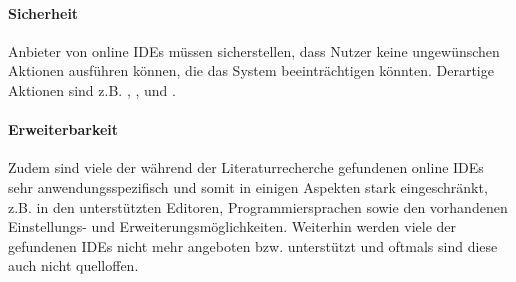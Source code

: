 \paragraph{Sicherheit}
Anbieter von online IDEs müssen sicherstellen, dass Nutzer keine ungewünschen Aktionen ausführen können, die das System beeinträchtigen könnten. Derartige Aktionen sind z.B. , ,  \cite{wu_ceclipse_2011} und  \cite{srinivasa_bad_2022}.

\paragraph{Erweiterbarkeit}
Zudem sind viele der während der Literaturrecherche gefundenen online IDEs sehr anwendungsspezifisch und somit in einigen Aspekten stark eingeschränkt, z.B. in den unterstützten Editoren, Programmiersprachen sowie den vorhandenen Einstellungs- und Erweiterungsmöglichkeiten. Weiterhin werden viele der gefundenen IDEs nicht mehr angeboten bzw. unterstützt und oftmals sind diese auch nicht quelloffen.

